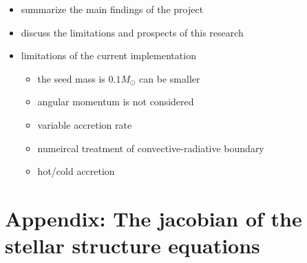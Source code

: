 \documentclass[12pt,a4paper]{article}
\newcommand{\pfird}[2][]{\frac{\partial#1}{\partial#2}}
\newenvironment{outline}[1]{%
  \begin{itemize}[label=\textbullet]%
  \color{#1}%
}{%
  \end{itemize}%
}
\begin{document}
\begin{outline}{gray}
  \item summarize the main findings of the project
  \item discuss the limitations and prospects of this research
  \item limitations of the current implementation
  \begin{itemize}
    \item the seed mass is $0.1 M_\odot$ can be smaller
    \item angular momentum is not considered
    \item variable accretion rate
    \item numeircal treatment of convective-radiative boundary
    \item hot/cold accretion
  \end{itemize}
\end{outline}


\newpage
\printbibliography[heading=bibintoc, title={References}]

\newpage
\appendix
\section{Appendix: The jacobian of the stellar structure equations}
\label{sec:appendix_jacobian}
\end{document}
